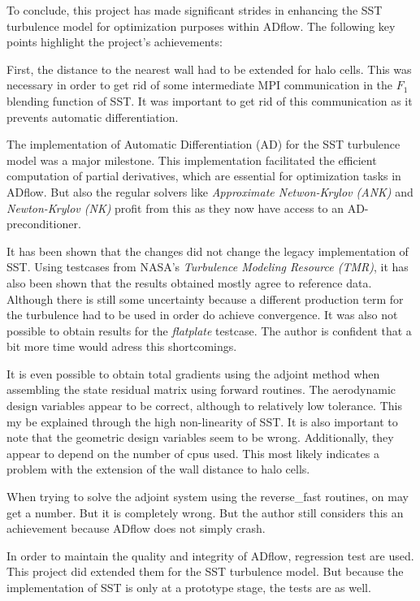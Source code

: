 To conclude, this project has made significant strides in enhancing the SST
turbulence model for optimization purposes within ADflow. The following key
points highlight the project's achievements:

First, the distance to the nearest wall had to be extended for halo cells. This
was necessary in order to get rid of some intermediate MPI communication in the
$F_1$ blending function of SST. It was important to get rid of this
communication as it prevents automatic differentiation.

The implementation of Automatic Differentiation (AD) for the SST turbulence
model was a major milestone. This implementation facilitated the efficient
computation of partial derivatives, which are essential for optimization tasks
in ADflow. But also the regular solvers like \textit{Approximate Netwon-Krylov
(ANK)} and \textit{Newton-Krylov (NK)} profit from this as they now have access
to an AD-preconditioner.

It has been shown that the changes did not change the legacy implementation of
SST. Using testcases from NASA's \textit{Turbulence Modeling Resource (TMR)},
it has also been shown that the results obtained mostly agree to reference data.
Although there is still some uncertainty because a different production term for
the turbulence had to be used in order do achieve convergence. It was also not
possible to obtain results for the \textit{flatplate} testcase. The author is
confident that a bit more time would adress this shortcomings.

It is even possible to obtain total gradients using the adjoint method when
assembling the state residual matrix using forward routines. The aerodynamic
design variables appear to be correct, although to relatively low tolerance.
This my be explained through the high non-linearity of SST. It is also
important to note that the geometric design variables seem to be wrong.
Additionally, they appear to depend on the number of cpus used. This most
likely indicates a problem with the extension of the wall distance to halo
cells.

When trying to solve the adjoint system using the reverse\_fast routines, on
may get a number. But it is completely wrong. But the author still considers
this an achievement because ADflow does not simply crash.

In order to maintain the quality and integrity of ADflow, regression test are
used. This project did extended them for the SST turbulence model. But because
the implementation of SST is only at a prototype stage, the tests are as well.

